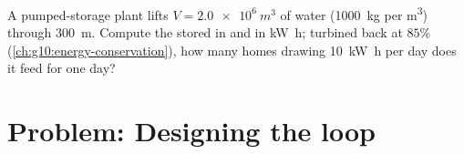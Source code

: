 \begin{exercise}[$\star\star\star$]\label{exo:g11:mechanical-energy:15}
A pumped-storage plant lifts $V = \qty{2.0e6}{m^3}$ of water
(\qty{1000}{kg} per \unit{m^3}) through \qty{300}{m}. Compute the
stored  in  and in \unit{kW.h}; turbined back at $85\%$
 (\cref{ch:g10:energy-conservation}), how many homes drawing
\qty{10}{kW.h} per day does it feed for one day?
\end{exercise}

\section{Problem: Designing the loop}

